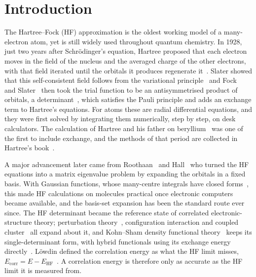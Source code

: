 \documentclass[aps,pra,reprint,superscriptaddress,amsmath,amssymb,longbibliography]{revtex4-2}
\newcommand{\EHF}{E_\mathrm{HF}}
\begin{document}
\maketitle

\section{Introduction}

The Hartree--Fock (HF) approximation is the oldest working model of a many-electron atom, yet is still widely used throughout quantum chemistry. In 1928, just two years after Schr\"odinger's equation, Hartree proposed that each electron moves in the field of the nucleus and the averaged charge of the other electrons, with that field iterated until the orbitals it produces regenerate it~\cite{Hartree1928}. Slater showed that this self-consistent field follows from the variational principle~\cite{Slater1928} and Fock~\cite{Fock1930} and Slater~\cite{Slater1930} then took the trial function to be an antisymmetrised product of orbitals, a determinant~\cite{Slater1929}, which satisfies the Pauli principle and adds an exchange term to Hartree's equations. For atoms these are radial differential equations, and they were first solved by integrating them numerically, step by step, on desk calculators. The calculation of Hartree and his father on beryllium~\cite{Hartree1935} was one of the first to include exchange, and the methods of that period are collected in Hartree's book~\cite{Hartree1957}.

A major advancement later came from Roothaan~\cite{Roothaan1951} and Hall~\cite{Hall1951} who turned the HF equations into a matrix eigenvalue problem by expanding the orbitals in a fixed basis. With Gaussian functions, whose many-centre integrals have closed forms~\cite{Boys1950}, this made HF calculations on molecules practical once electronic computers became available, and the basis-set expansion has been the standard route ever since. The HF determinant became the reference state of correlated electronic-structure theory; perturbation theory~\cite{Moller1934}, configuration interaction and coupled cluster~\cite{Cizek1966} all expand about it, and Kohn--Sham density functional theory~\cite{KohnSham1965} keeps its single-determinant form, with hybrid functionals using its exchange energy directly~\cite{Becke1993}. L\"owdin defined the correlation energy as what the HF limit misses, $E_\mathrm{corr}=E-\EHF$~\cite{Lowdin1959}. A correlation energy is therefore only as accurate as the HF limit it is measured from.
\end{document}
